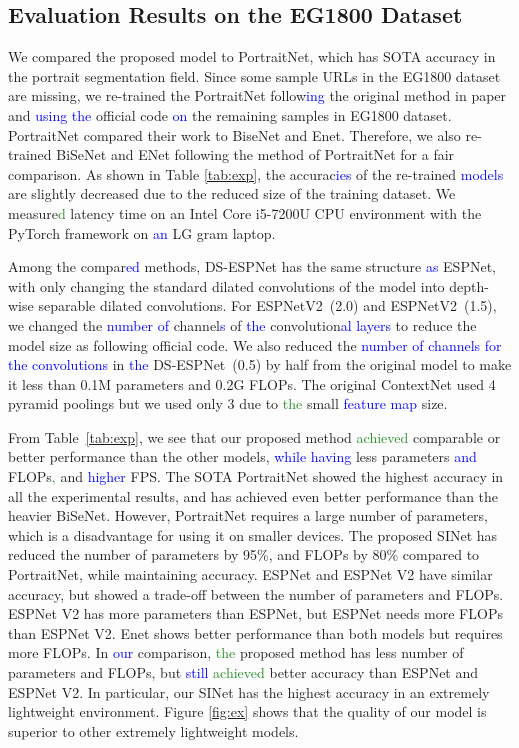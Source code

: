 \documentclass[10pt,twocolumn,letterpaper]{article}
\newcommand\Lars[1]{\textcolor{blue}{#1}}
\newcommand\yj[1]{\textcolor{ForestGreen}{#1}}
\newcommand\Lars[1]{#1}
\newcommand\yj[1]{#1}
\begin{document}
\subsection{Evaluation Results on the EG1800 Dataset}
\label{sec:EG1800}
We compared the proposed model to PortraitNet\cite{zhang2019portraitnet}, which has SOTA accuracy in the portrait segmentation field. 
Since some sample URLs in the EG1800 dataset are missing, we re-trained the PortraitNet follow\Lars{ing} the original method in paper and \Lars{using the} official code \Lars{on} the remaining samples in EG1800 dataset.
PortraitNet compared their work to BiseNet and Enet. Therefore, we also re-trained BiSeNet and ENet following the method of PortraitNet for a fair comparison.
As shown in Table \ref{tab:exp}, the accurac\Lars{ies} of the re-trained \Lars{models} are slightly decreased due to the reduced size of the training dataset.
We measure\yj{d} latency time on an Intel Core i5-7200U CPU environment with the PyTorch framework on \Lars{an} LG gram laptop.

Among the compar\Lars{ed} methods, DS-ESPNet has the same structure \Lars{as} ESPNet, with only changing the standard dilated convolutions of the model into depth-wise separable dilated convolutions.
For ESPNetV2~(2.0) and ESPNetV2~(1.5), we changed the \Lars{number of} channel\Lars{s} of \Lars{the} convolution\Lars{al layers} to reduce the model size as following official code. 
We also reduced the \Lars{number of channels for the convolutions} in \Lars{the} DS-ESPNet~(0.5) by half from the original model to make it less than 0.1M parameters and 0.2G FLOPs.
The original ContextNet used 4 pyramid poolings but we used only 3 due to \yj{the} small \Lars{feature map} size.

From Table~\ref{tab:exp}, we see that our proposed method \yj{achieved} comparable or better performance than the other models, \Lars{while having} less parameters \Lars{and} FLOPs\yj{,} and \Lars{higher} FPS.
The SOTA PortraitNet showed the highest accuracy in all the experimental results, and has achieved even better performance than the heavier BiSeNet.
However, PortraitNet requires a large number of parameters, which is a disadvantage for using it on smaller devices.
The proposed SINet has reduced the number of parameters by 95\%, and FLOPs by 80\% compared to PortraitNet, while maintaining accuracy.
ESPNet and ESPNet V2 have similar accuracy, but showed a trade-off between the number of parameters and FLOPs.
ESPNet V2 has more parameters than ESPNet, but ESPNet needs more FLOPs than ESPNet V2.
Enet shows better performance than both models but requires more FLOPs.
In \Lars{our} comparison, \yj{the} proposed method has less number of parameters and FLOPs, but \Lars{still} \yj{achieved} better accuracy than ESPNet and ESPNet V2.
In particular, our SINet has the highest accuracy in an extremely lightweight environment.
Figure \ref{fig:ex} shows that the quality of our model is superior to other extremely lightweight models.
\end{document}
